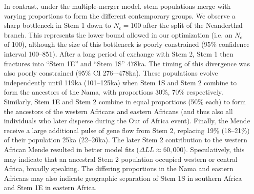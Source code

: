 \documentclass[]{article}
\begin{document}
In contrast, under the multiple-merger model, stem populations merge with
varying proportions to form the different contemporary groups.  We observe a
sharp bottleneck in Stem 1 down to $N_e=100$ after the split of the Neanderthal
branch. This represents the lower bound allowed in our optimization (i.e. an
$N_e$ of 100), although the size of this bottleneck is poorly constrained (95\%
confidence interval 100--851). After a long period of exchange with Stem 2,
Stem 1 then fractures into ``Stem 1E'' and ``Stem 1S'' 478ka. The timing of
this divergence was also poorly constrained (95\% CI 276–-478ka).  These
populations evolve independently until 119ka (101--125ka) when Stem 1S and Stem
2 combine to form the ancestors of the Nama, with proportions 30\%, 70\%
respectively. Similarly, Stem 1E and Stem 2 combine in equal proportions (50\%
each) to form the ancestors of the western Africans and eastern Africans (and
thus also all individuals who later disperse during the Out of Africa event).
Finally, the Mende receive a large additional pulse of gene flow from Stem 2,
replacing 19\% (18--21\%) of their population 25ka (22--26ka). The later Stem 2
contribution to the western African Mende resulted in better model fits
($\Delta LL \approx 60,000$).  Speculatively, this may indicate that an
ancestral Stem 2 population occupied western or central Africa, broadly
speaking. The differing proportions in the Nama and eastern Africans may also
indicate geographic separation of Stem 1S in southern Africa and Stem 1E in
eastern Africa. 
\end{document}
